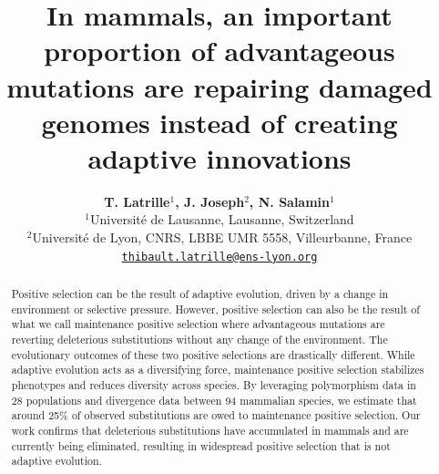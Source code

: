\documentclass{article}
\title{In mammals, an important proportion of advantageous mutations are repairing damaged genomes instead of creating adaptive innovations}
\author{
    \large
    \textbf{T. {Latrille}$^{1}$, J. {Joseph}$^{2}$, N. {Salamin}$^{1}$}\\
    \normalsize
    $^{1}$Université de Lausanne, Lausanne, Switzerland\\
    $^{2}$Université de Lyon, CNRS, LBBE UMR 5558, Villeurbanne, France \\
    \texttt{\href{mailto:thibault.latrille@ens-lyon.org}{thibault.latrille@ens-lyon.org}} \\
}
\begin{document}
    \maketitle

    \begin{abstract}
        Positive selection can be the result of adaptive evolution, driven by a change in environment or selective pressure.
        However, positive selection can also be the result of what we call maintenance positive selection where advantageous mutations are reverting deleterious substitutions without any change of the environment.
        The evolutionary outcomes of these two positive selections are drastically different.
        While adaptive evolution acts as a diversifying force, maintenance positive selection stabilizes phenotypes and reduces diversity across species.
        By leveraging polymorphism data in 28 populations and divergence data between 94 mammalian species, we estimate that around 25\% of observed substitutions are owed to maintenance positive selection.
        Our work confirms that deleterious substitutions have accumulated in mammals and are currently being eliminated, resulting in widespread positive selection that is not adaptive evolution.
    \end{abstract}

\end{document}
